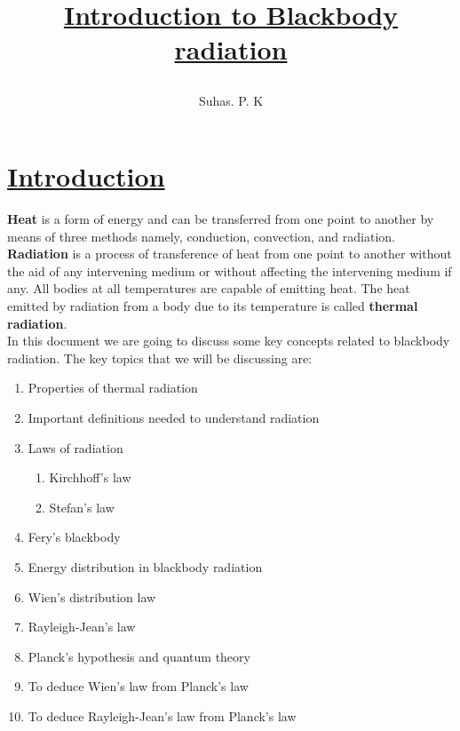\documentclass[14pt,a4paper]{article}
\title{\begin{huge}{\textbf{\underline{Introduction to Blackbody radiation}}}\end{huge}}
\author{\begin{large}{Suhas. P. K}\end{large}}
\date{}
\begin{document}
\maketitle


\section*{\underline{Introduction}}
\vspace{0.2cm}
\textbf{Heat} is a form of energy and can be transferred from one point to another by means of three methods namely, conduction, convection, and radiation.
\textbf{Radiation} is a process of transference of heat from one point to another without the aid of any intervening medium or without affecting the intervening medium if any. All bodies at all temperatures are capable of emitting heat. The heat emitted by radiation from a body due to its temperature is called \textbf{thermal radiation}.
\\
In this document we are going to discuss some key concepts related to blackbody radiation. The key topics that we will be discussing are: 
\begin{enumerate}
	\item Properties of thermal radiation
	\item Important definitions needed to understand radiation
	\item Laws of radiation
	\begin{enumerate}
		\item Kirchhoff's law
		\item Stefan's law
	\end{enumerate}
	\item Fery's blackbody
	\item Energy distribution in blackbody radiation
	\item Wien's distribution law
	\item Rayleigh-Jean's law
	\item Planck's hypothesis and quantum theory
	\item To deduce Wien's law from Planck's law
	\item To deduce Rayleigh-Jean's law from Planck's law
\end{enumerate}  

\newpage
\end{document}
